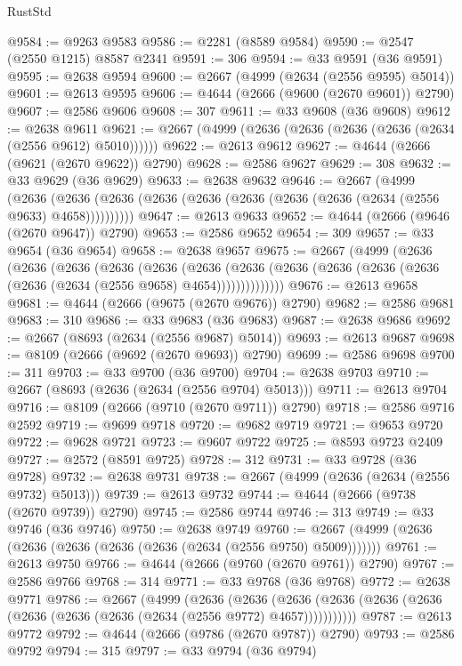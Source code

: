 \begin{lexlean}{RustStd}
\begin{coremodule}
@9584 := @9263 @9583
@9586 := @2281 (@8589 @9584)
@9590 := @2547 (@2550 @1215) @8587 @2341
@9591 := 306
@9594 := @33 @9591 (@36 @9591)
@9595 := @2638 @9594
@9600 := @2667 (@4999 (@2634 (@2556 @9595) @5014))
@9601 := @2613 @9595
@9606 := @4644 (@2666 (@9600 (@2670 @9601)) @2790)
@9607 := @2586 @9606
@9608 := 307
@9611 := @33 @9608 (@36 @9608)
@9612 := @2638 @9611
@9621 := @2667 (@4999 (@2636 (@2636 (@2636 (@2636 (@2634 (@2556 @9612) @5010))))))
@9622 := @2613 @9612
@9627 := @4644 (@2666 (@9621 (@2670 @9622)) @2790)
@9628 := @2586 @9627
@9629 := 308
@9632 := @33 @9629 (@36 @9629)
@9633 := @2638 @9632
@9646 := @2667
    (@4999
      (@2636 (@2636 (@2636 (@2636 (@2636 (@2636 (@2636 (@2636 (@2634 (@2556 @9633) @4658))))))))))
@9647 := @2613 @9633
@9652 := @4644 (@2666 (@9646 (@2670 @9647)) @2790)
@9653 := @2586 @9652
@9654 := 309
@9657 := @33 @9654 (@36 @9654)
@9658 := @2638 @9657
@9675 := @2667
    (@4999
      (@2636
        (@2636
          (@2636
            (@2636
              (@2636
                (@2636
                  (@2636 (@2636 (@2636 (@2636 (@2636 (@2636 (@2634 (@2556 @9658) @4654))))))))))))))
@9676 := @2613 @9658
@9681 := @4644 (@2666 (@9675 (@2670 @9676)) @2790)
@9682 := @2586 @9681
@9683 := 310
@9686 := @33 @9683 (@36 @9683)
@9687 := @2638 @9686
@9692 := @2667 (@8693 (@2634 (@2556 @9687) @5014))
@9693 := @2613 @9687
@9698 := @8109 (@2666 (@9692 (@2670 @9693)) @2790)
@9699 := @2586 @9698
@9700 := 311
@9703 := @33 @9700 (@36 @9700)
@9704 := @2638 @9703
@9710 := @2667 (@8693 (@2636 (@2634 (@2556 @9704) @5013)))
@9711 := @2613 @9704
@9716 := @8109 (@2666 (@9710 (@2670 @9711)) @2790)
@9718 := @2586 @9716 @2592
@9719 := @9699 @9718
@9720 := @9682 @9719
@9721 := @9653 @9720
@9722 := @9628 @9721
@9723 := @9607 @9722
@9725 := @8593 @9723 @2409
@9727 := @2572 (@8591 @9725)
@9728 := 312
@9731 := @33 @9728 (@36 @9728)
@9732 := @2638 @9731
@9738 := @2667 (@4999 (@2636 (@2634 (@2556 @9732) @5013)))
@9739 := @2613 @9732
@9744 := @4644 (@2666 (@9738 (@2670 @9739)) @2790)
@9745 := @2586 @9744
@9746 := 313
@9749 := @33 @9746 (@36 @9746)
@9750 := @2638 @9749
@9760 := @2667 (@4999 (@2636 (@2636 (@2636 (@2636 (@2636 (@2634 (@2556 @9750) @5009)))))))
@9761 := @2613 @9750
@9766 := @4644 (@2666 (@9760 (@2670 @9761)) @2790)
@9767 := @2586 @9766
@9768 := 314
@9771 := @33 @9768 (@36 @9768)
@9772 := @2638 @9771
@9786 := @2667
    (@4999
      (@2636
        (@2636
          (@2636 (@2636 (@2636 (@2636 (@2636 (@2636 (@2636 (@2634 (@2556 @9772) @4657)))))))))))
@9787 := @2613 @9772
@9792 := @4644 (@2666 (@9786 (@2670 @9787)) @2790)
@9793 := @2586 @9792
@9794 := 315
@9797 := @33 @9794 (@36 @9794)

\end{coremodule}
\end{lexlean}
